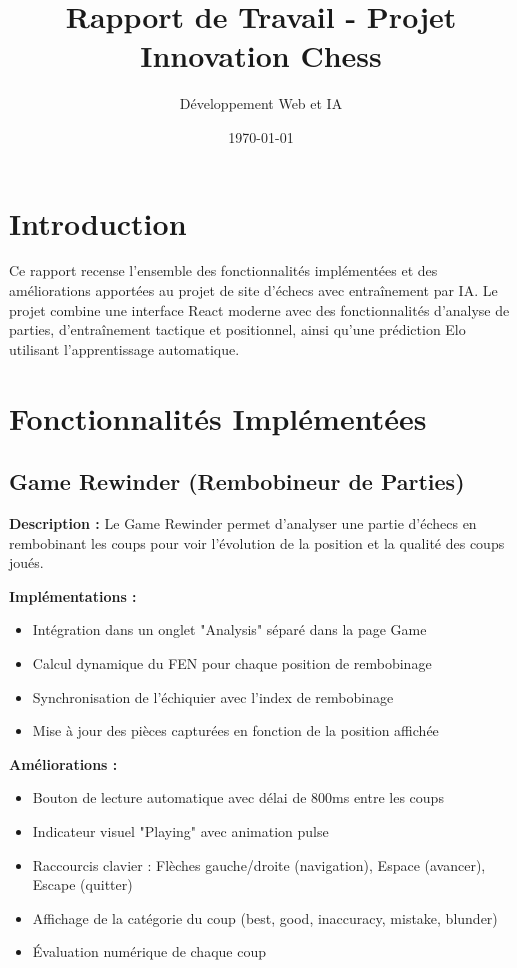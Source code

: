 \documentclass[a4paper,12pt]{article}
\title{\textbf{Rapport de Travail - Projet Innovation Chess}}
\author{Développement Web et IA}
\date{\today}
\begin{document}
\maketitle

\tableofcontents
\newpage

\section{Introduction}

Ce rapport recense l'ensemble des fonctionnalités implémentées et des améliorations apportées au projet de site d'échecs avec entraînement par IA. Le projet combine une interface React moderne avec des fonctionnalités d'analyse de parties, d'entraînement tactique et positionnel, ainsi qu'une prédiction Elo utilisant l'apprentissage automatique.

\section{Fonctionnalités Implémentées}

\subsection{Game Rewinder (Rembobineur de Parties)}

\textbf{Description :}
Le Game Rewinder permet d'analyser une partie d'échecs en rembobinant les coups pour voir l'évolution de la position et la qualité des coups joués.

\textbf{Implémentations :}
\begin{itemize}
    \item Intégration dans un onglet "Analysis" séparé dans la page Game
    \item Calcul dynamique du FEN pour chaque position de rembobinage
    \item Synchronisation de l'échiquier avec l'index de rembobinage
    \item Mise à jour des pièces capturées en fonction de la position affichée
\end{itemize}

\textbf{Améliorations :}
\begin{itemize}
    \item Bouton de lecture automatique avec délai de 800ms entre les coups
    \item Indicateur visuel "Playing" avec animation pulse
    \item Raccourcis clavier : Flèches gauche/droite (navigation), Espace (avancer), Escape (quitter)
    \item Affichage de la catégorie du coup (best, good, inaccuracy, mistake, blunder)
    \item Évaluation numérique de chaque coup
\end{itemize}
\end{document}
